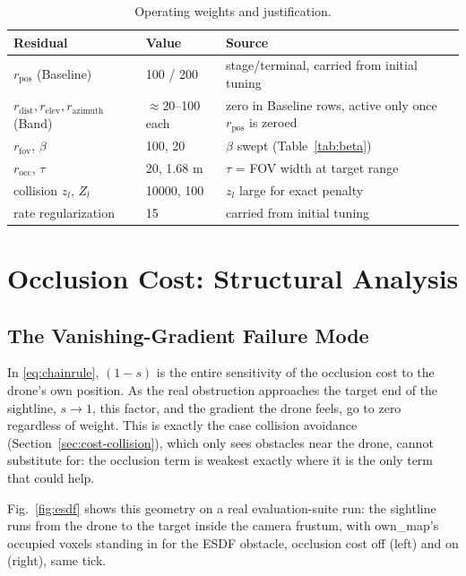 \documentclass[conference]{IEEEtran}
\begin{document}
\begin{table}[t]
\centering
\caption{Operating weights and justification.}
\label{tab:weights}
\begin{tabular}{llp{3.6cm}}
\hline
Residual & Value & Source \\
\hline
$r_{\text{pos}}$ (Baseline) & 100 / 200 & stage/terminal, carried from initial tuning \\
$r_{\text{dist}}, r_{\text{elev}}, r_{\text{azimuth}}$ (Band) & $\approx$20--100 each & zero in Baseline rows, active only once $r_{\text{pos}}$ is zeroed \\
$r_{\text{fov}}$, $\beta$ & 100, 20 & $\beta$ swept (Table~\ref{tab:beta}) \\
$r_{\text{occ}}$, $\tau$ & 20, 1.68 m & $\tau$ = FOV width at target range \\
collision $z_l$, $Z_l$ & 10000, 100 & $z_l$ large for exact penalty \\
rate regularization & 15 & carried from initial tuning \\
\hline
\end{tabular}
\end{table}

\section{Occlusion Cost: Structural Analysis}
\label{sec:occanalysis}

\subsection{The Vanishing-Gradient Failure Mode}
\label{sec:occlusion-vanish}

In \eqref{eq:chainrule}, $(1-s)$ is the entire sensitivity of the occlusion cost to the drone's own position. As the real obstruction approaches the target end of the sightline, $s\to1$, this factor, and the gradient the drone feels, go to zero regardless of weight. This is exactly the case collision avoidance (Section~\ref{sec:cost-collision}), which only sees obstacles near the drone, cannot substitute for: the occlusion term is weakest exactly where it is the only term that could help.

Fig.~\ref{fig:esdf} shows this geometry on a real evaluation-suite run: the sightline runs from the drone to the target inside the camera frustum, with own\_map's occupied voxels standing in for the ESDF obstacle, occlusion cost off (left) and on (right), same tick.
\end{document}
